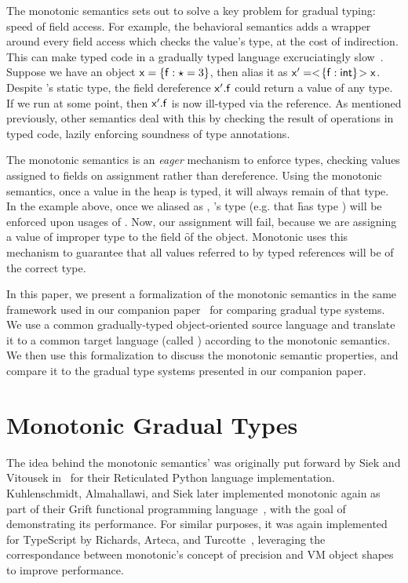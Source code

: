 \documentclass[sigconf]{acmart}
\begin{document}
The monotonic semantics sets out to solve a key problem for gradual typing:
speed of field access. For example, the behavioral semantics adds a wrapper
around every field access which checks the value's type, at the cost of
indirection. This can make typed code in a gradually typed language
excruciatingly slow~\cite{popl16}.  Suppose we have an object $\x = \{ \f:\any
= 3 \}$, then alias it as $\xp = \SubCast{\{ \f:\xt{int}   \}}\x$. Despite
\xp's static type, the field dereference $\xp.\f$ could return a value of any
type. If we run  at some point, then $\xp.\f$ is now ill-typed 
via the reference. As mentioned previously, other semantics deal with
this by checking the result of operations in typed code, lazily enforcing
soundness of type annotations.

The monotonic semantics is an \emph{eager} mechanism to enforce types,
checking values assigned to fields on assignment rather than dereference. Using
the monotonic semantics, once a value in the heap is typed, it will always remain of that
type. In the example above, once we aliased \x as \xp, \xp's type (e.g. that
\f has type ) will be enforced upon usages of \x. Now, our assignment
 will fail, because we are assigning a value of improper
type to the field \f of the object. Monotonic uses this mechanism to guarantee
that all values referred to by typed references will be of the correct type.

In this paper, we present a formalization of the monotonic semantics in the
same framework used in our companion paper~\cite{us} for comparing gradual
type systems. We use a common gradually-typed object-oriented source language
and translate it to a common target language (called \kafka) according to the
monotonic semantics. We then use this formalization to discuss the monotonic
semantic properties, and compare it to the gradual type systems presented in
our companion paper.

\section{Monotonic Gradual Types}

The idea behind the monotonic semantics' was originally put forward by Siek and
Vitousek in~\cite{siek14} for their Reticulated Python language
implementation. Kuhlenschmidt, Almahallawi, and Siek later implemented
monotonic again as part of their Grift functional programming language~\cite
{monotonic-grift}, with the goal of demonstrating its performance. For similar
purposes, it was again implemented for TypeScript by Richards, Arteca, and
Turcotte~\cite {richards-bettermono}, leveraging the correspondance between
monotonic's concept of precision and VM object shapes to improve performance.
\end{document}
